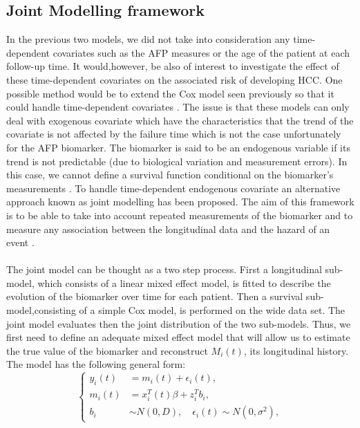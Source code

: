 \documentclass[11pt,twoside]{article}
\numberwithin{Theorem}{section}
\numberwithin{Definition}{section}
\numberwithin{Lemma}{section}
\numberwithin{Algorithm}{section}
\numberwithin{equation}{section}
\begin{document}
\subsection{Joint Modelling framework}
In the previous two models, we did not take into consideration any time-dependent covariates such as the AFP measures or the age of the patient at each follow-up time. It would,however, be also of interest to investigate the effect of these time-dependent covariates on the associated risk of developing HCC.
\newline
\newline
One possible method would be to extend the Cox model seen previously so that it could handle time-dependent covariates \cite{andersen1982cox}. The issue is that these models can only deal with exogenous covariate  which have the characteristics that the trend of the covariate is not affected by the failure time which is not the case unfortunately for the AFP biomarker. The biomarker is said to be an endogenous variable if its trend is not predictable (due to biological variation and measurement errors). In this case, we cannot  define a survival function conditional on the biomarker's measurements \cite{kalbfleisch2002survival}.
\newline
\newline
To handle time-dependent endogenous covariate an alternative approach known as joint modelling has been proposed.
The aim of this framework is to be able to take into account repeated measurements of the biomarker and to measure any association between the longitudinal data and the hazard of an event  \cite{Rizopoulos2016}.
\\ \\
The joint model can be thought as a two step process. First a longitudinal sub-model, which consists of a linear mixed effect model, is fitted to describe the evolution of the biomarker over time for each patient. Then a survival sub-model,consisting of a simple Cox model, is performed on the wide data set. The joint model evaluates then the joint distribution of the two sub-models.
%
Thus, we first need to define an adequate mixed effect model that will allow us to estimate the true value of the biomarker and reconstruct $M_i(t)$, its longitudinal history. The model has the following general form:
\begin{equation}
\label{eq:MEM}
\left\{\begin{aligned}
y_i(t)&=m_i(t) + \epsilon_i(t),\\
m_i(t)&=x_i^T(t) \beta + z_i^{T}b_i,\\
b_i &\sim N(0,D),\quad \epsilon_i(t) \sim N(0,\sigma^{2}),
\end{aligned}
\right.
\end{equation}
\end{document}
